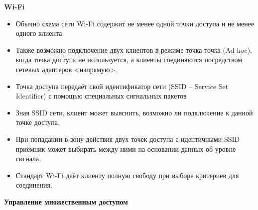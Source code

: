 \textbf{\textbf{Wi-Fi}}

\begin{itemize}
    \item Обычно схема сети Wi-Fi содержит не менее одной точки доступа и не менее одного клиента.
    \item Также возможно подключение двух клиентов в режиме точка-точка (Ad-hoc), когда точка доступа не используется, а клиенты соединяются посредством сетевых адаптеров <напрямую>.
    \item Точка доступа передаёт свой идентификатор сети (SSID -- Service Set Identifier) с помощью специальных сигнальных пакетов
    \item Зная SSID сети, клиент может выяснить, возможно ли подключение к данной точке доступа.
    \item При попадании в зону действия двух точек доступа с идентичными SSID приёмник может выбирать между ними на основании данных об уровне сигнала.
    \item Стандарт Wi-Fi даёт клиенту полную свободу при выборе критериев для соединения.
\end{itemize}

\textbf{\textbf{Управление множественным доступом}}

